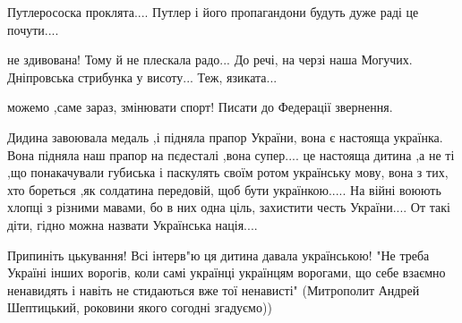 \begin{itemize}
Путлерососка проклята.... Путлер і його пропагандони будуть дуже раді це почути....

 
не здивована!
Тому й не плескала радо...
До речі, на черзі наша Могучих.
Дніпровська стрибунка у висоту...
Теж, язиката...

 
можемо ,саме зараз, змінювати спорт!
Писати до Федерації звернення.

 

Дидина завоювала медаль ,і підняла прапор України, вона є настояща українка. Вона
підняла наш прапор на пєдесталі ,вона супер.... це настояща дитина ,а не ті ,що
понакачували губиська і паскулять своїм ротом українську мову, вона з тих, хто
бореться ,як солдатина передовій, щоб бути українкою..... На війні воюють хлопці
з різними мавами, бо в них одна ціль, захистити честь України.... От такі
діти, гідно можна назвати Українська нація....

 

Припиніть цькування! Всі інтерв"ю ця дитина давала українською! "Не треба
Україні інших ворогів, коли самі українці українцям ворогами, що себе взаємно
ненавидять і навіть не стидаються вже тої ненависті" (Митрополит Андрей
Шептицький, роковини якого согодні згадуємо))


 

\end{itemize}
